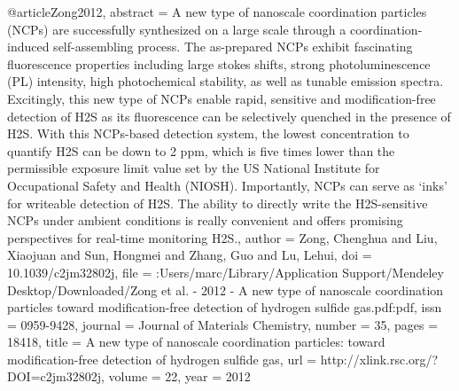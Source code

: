 @article{Zong2012,
abstract = {A new type of nanoscale coordination particles (NCPs) are successfully synthesized on a large scale through a coordination-induced self-assembling process. The as-prepared NCPs exhibit fascinating fluorescence properties including large stokes shifts, strong photoluminescence (PL) intensity, high photochemical stability, as well as tunable emission spectra. Excitingly, this new type of NCPs enable rapid, sensitive and modification-free detection of H2S as its fluorescence can be selectively quenched in the presence of H2S. With this NCPs-based detection system, the lowest concentration to quantify H2S can be down to 2 ppm, which is five times lower than the permissible exposure limit value set by the US National Institute for Occupational Safety and Health (NIOSH). Importantly, NCPs can serve as ‘inks' for writeable detection of H2S. The ability to directly write the H2S-sensitive NCPs under ambient conditions is really convenient and offers promising perspectives for real-time monitoring H2S.},
author = {Zong, Chenghua and Liu, Xiaojuan and Sun, Hongmei and Zhang, Guo and Lu, Lehui},
doi = {10.1039/c2jm32802j},
file = {:Users/marc/Library/Application Support/Mendeley Desktop/Downloaded/Zong et al. - 2012 - A new type of nanoscale coordination particles toward modification-free detection of hydrogen sulfide gas.pdf:pdf},
issn = {0959-9428},
journal = {Journal of Materials Chemistry},
number = {35},
pages = {18418},
title = {{A new type of nanoscale coordination particles: toward modification-free detection of hydrogen sulfide gas}},
url = {http://xlink.rsc.org/?DOI=c2jm32802j},
volume = {22},
year = {2012}
}
